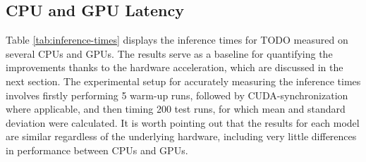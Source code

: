 \subsection{CPU and GPU Latency}
Table \ref{tab:inference-times} displays the inference times for TODO measured on several CPUs and GPUs. The results serve as a baseline for quantifying the improvements thanks to the hardware acceleration, which are discussed in the next section. The experimental setup for accurately measuring the inference times involves firstly performing 5 warm-up runs, followed by CUDA-synchronization where applicable, and then timing 200 test runs, for which mean and standard deviation were calculated. It is worth pointing out that the results for each model are similar regardless of the underlying hardware, including very little differences in performance between CPUs and GPUs.

